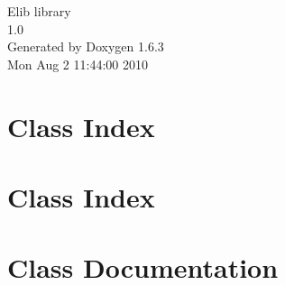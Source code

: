 \documentclass[a4paper]{book}
\begin{document}
\hypersetup{pageanchor=false}
\begin{titlepage}
\vspace*{7cm}
\begin{center}
{\Large Elib library \\[1ex]\large 1.0 }\\
\vspace*{1cm}
{\large Generated by Doxygen 1.6.3}\\
\vspace*{0.5cm}
{\small Mon Aug 2 11:44:00 2010}\\
\end{center}
\end{titlepage}
\clearemptydoublepage
{}
\tableofcontents
\clearemptydoublepage
{}
\hypersetup{pageanchor=true}
\chapter{Class Index}

\chapter{Class Index}

\chapter{Class Documentation}










\printindex
\end{document}
